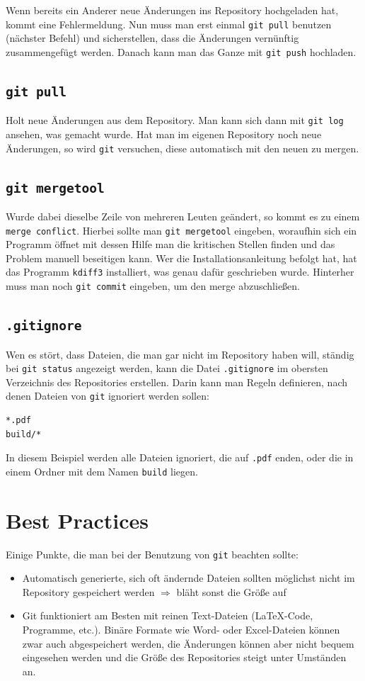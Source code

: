 Wenn bereits ein Anderer neue Änderungen ins Repository hochgeladen hat, kommt eine Fehlermeldung.
Nun muss man erst einmal \verb|git pull| benutzen (nächster Befehl) und sicherstellen, dass die Änderungen vernünftig zusammengefügt werden.
Danach kann man das Ganze mit \verb|git push| hochladen.

\subsection{\texttt{git pull}}
Holt neue Änderungen aus dem Repository.
Man kann sich dann mit \verb|git log| ansehen, was gemacht wurde.
Hat man im eigenen Repository noch neue Änderungen, so wird \texttt{git} versuchen, diese automatisch mit den neuen zu mergen.

\subsection{\texttt{git mergetool}}
Wurde dabei dieselbe Zeile von mehreren Leuten geändert, so kommt es zu einem \verb|merge conflict|.
Hierbei sollte man \verb|git mergetool| eingeben, woraufhin sich ein Programm öffnet mit dessen Hilfe man die kritischen Stellen finden und das Problem manuell beseitigen kann.
Wer die Installationsanleitung befolgt hat, hat das Programm \verb|kdiff3| installiert, was genau dafür geschrieben wurde.
Hinterher muss man noch \verb|git commit| eingeben, um den merge abzuschließen.

\subsection{\texttt{.gitignore}}
Wen es stört, dass Dateien, die man gar nicht im Repository haben will, ständig bei \verb|git status| angezeigt werden, kann die Datei \verb|.gitignore| im obersten Verzeichnis des Repositories erstellen.
Darin kann man Regeln definieren, nach denen Dateien von \verb|git| ignoriert werden sollen:
\begin{verbatim}
*.pdf
build/*
\end{verbatim}
In diesem Beispiel werden alle Dateien ignoriert, die auf \verb|.pdf| enden, oder die in einem Ordner mit dem Namen \verb|build| liegen.

\section{Best Practices}

Einige Punkte, die man bei der Benutzung von \texttt{git} beachten sollte:
\begin{itemize}
  \item Automatisch generierte, sich oft ändernde Dateien sollten möglichst nicht im Repository gespeichert werden
    $\Rightarrow$ bläht sonst die Größe auf
  \item Git funktioniert am Besten mit reinen Text-Dateien (\LaTeX-Code, Programme, etc.).
    Binäre Formate wie Word- oder Excel-Dateien können zwar auch abgespeichert werden, die Änderungen können aber nicht bequem eingesehen werden und die Größe des Repositories steigt unter Umständen an.
\end{itemize}

